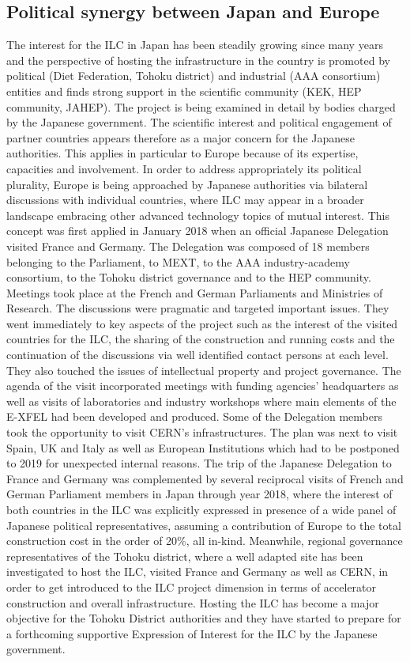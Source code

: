 \documentclass[%
 reprint,
 floatfix,
 amsmath,amssymb,
 aps,
]{revtex4-1}
\begin{document}
\subsection{\label{sec:discussionPol}Political synergy between Japan and Europe}

The interest for the ILC in Japan has been steadily growing since many years and the perspective
of hosting the infrastructure in the country is promoted by political (Diet Federation, Tohoku district)
and industrial (AAA consortium) entities and finds strong support in the scientific community (KEK,
HEP community, JAHEP). The project is being examined in detail by bodies charged by the Japanese government. The scientific interest and political
engagement of partner countries appears therefore as a major concern for the Japanese authorities. This
applies in particular to Europe because of its expertise, capacities and involvement.
In order to address appropriately its political plurality, Europe is being approached by Japanese
authorities via bilateral discussions with individual countries, where ILC may appear in a broader
landscape embracing other advanced technology topics of mutual interest. This concept was first applied
in January 2018 when an official Japanese Delegation visited France and Germany. The Delegation
was composed of 18 members belonging to the Parliament, to MEXT, to the AAA industry-academy
consortium, to the Tohoku district governance and to the HEP community. Meetings took place at
the French and German Parliaments and Ministries of Research. The discussions were pragmatic and
targeted important issues. They went immediately to key aspects of the project such as the interest of
the visited countries for the ILC, the sharing of the construction and running costs and the continuation
of the discussions via well identified contact persons at each level. They also touched the issues of
intellectual property and project governance. The agenda of the visit incorporated meetings with funding
agencies' headquarters as well as visits of laboratories and industry workshops where main elements of
the E-XFEL had been developed and produced. Some of the Delegation members took the opportunity
to visit CERN's infrastructures. The plan was next to visit Spain, UK and Italy as well as European
Institutions which had to be postponed to 2019 for unexpected internal reasons.
The trip of the Japanese Delegation to France and Germany was complemented by several reciprocal
visits of French and German Parliament members in Japan through year 2018, where the interest of
both countries in the ILC was explicitly expressed in presence of a wide panel of Japanese political
representatives, assuming a contribution of Europe to the total construction cost in the order of 20\%,
all in-kind. Meanwhile, regional governance representatives of the Tohoku district, where a well adapted
site has been investigated to host the ILC, visited France and Germany as well as CERN, in order to get
introduced to the ILC project dimension in terms of accelerator construction and overall infrastructure.
Hosting the ILC has become a major objective for the Tohoku District authorities and they have started
to prepare for a forthcoming supportive Expression of Interest for the ILC by the Japanese government.
\end{document}
